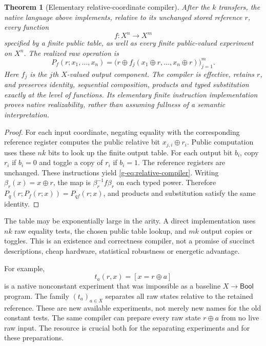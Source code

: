 \documentclass[11pt]{article}
\newtheorem{theorem}{Theorem}[section]
\theoremstyle{definition}
\theoremstyle{remark}
\newcommand{\Bool}{\mathsf{Bool}}
\begin{document}
\begin{theorem}[Elementary relative-coordinate compiler]\label{g-thm:compiler}
After the $k$ transfers, the native language above implements, relative to its unchanged stored reference $r$, every function
\[
 f:X^n\longrightarrow X^m
\]
specified by a finite public table, as well as every finite public-valued experiment on $X^n$. The realized raw operation is
\begin{equation}\label{g-eq:relative-compiler}
 P_f(r;x_1,\ldots,x_n)
 =\bigl(r\oplus f_j(x_1\oplus r,\ldots,x_n\oplus r)\bigr)_{j=1}^m.
\end{equation}
Here $f_j$ is the $j$th $X$-valued output component. The compiler is effective, retains $r$, and preserves identity, sequential composition, products and typed substitution exactly at the level of functions. Its elementary finite instruction implementation proves native realizability, rather than assuming fullness of a semantic interpretation.
\end{theorem}
\begin{proof}
For each input coordinate, negating equality with the corresponding reference register computes the public relative bit $x_{j,i}\oplus r_i$. Public computation uses these $nk$ bits to look up the finite output table. For each output bit $b_i$, copy $r_i$ if $b_i=0$ and toggle a copy of $r_i$ if $b_i=1$. The reference registers are unchanged. These instructions yield \eqref{g-eq:relative-compiler}. Writing $\beta_r(x)=x\oplus r$, the map is $\beta_r^{-1}f\beta_r$ on each typed power. Therefore
$P_q(r;P_f(r;x))=P_{qf}(r;x)$, and products and substitution satisfy the same identity.\end{proof}

The table may be exponentially large in the arity. A direct implementation uses $nk$ raw equality tests, the chosen public table lookup, and $mk$ output copies or toggles. This is an existence and correctness compiler, not a promise of succinct descriptions, cheap hardware, statistical robustness or energetic advantage.

For example,
\[
 t_a(r,x)=[x=r\oplus a]
\]
is a native nonconstant experiment that was impossible as a baseline $X\to\Bool$ program. The family $(t_a)_{a\in X}$ separates all raw states relative to the retained reference. These are new available experiments, not merely new names for the old constant tests. The same compiler can prepare every raw state $r\oplus a$ from no live raw input. The resource is crucial both for the separating experiments and for these preparations.
\end{document}
